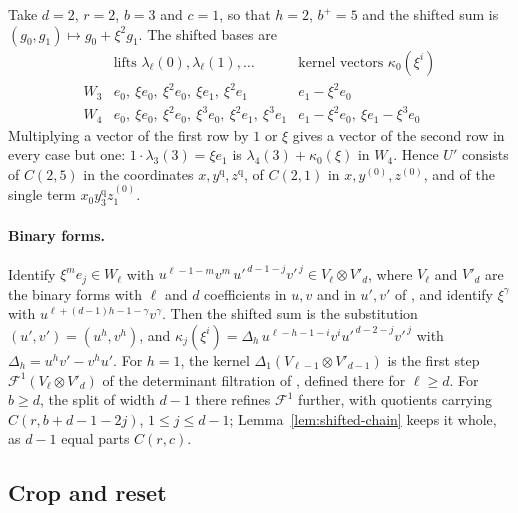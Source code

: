\begin{example}\label{ex:shifted-chain}
Take \(d=2\), \(r=2\), \(b=3\) and \(c=1\), so that \(h=2\), \(b^+=5\)
and the shifted sum is \((g_0,g_1)\mapsto g_0+\xi^2g_1\). The shifted
bases are
\[
\begin{array}{c|l|l}
 &\text{lifts }\lambda_\ell(0),\lambda_\ell(1),\ldots&\text{kernel vectors }\kappa_0(\xi^i)\\ \hline
 W_3&e_0,\ \xi e_0,\ \xi^2e_0,\ \xi e_1,\ \xi^2e_1&e_1-\xi^2e_0\\
 W_4&e_0,\ \xi e_0,\ \xi^2e_0,\ \xi^3e_0,\ \xi^2e_1,\ \xi^3e_1&e_1-\xi^2e_0,\ \xi e_1-\xi^3e_0
\end{array}
\]
Multiplying a vector of the first row by \(1\) or \(\xi\) gives a vector
of the second row in every case but one: \(1\cdot\lambda_3(3)=\xi e_1\)
is \(\lambda_4(3)+\kappa_0(\xi)\) in \(W_4\). Hence \(U'\) consists of
\(C(2,5)\) in the coordinates \(x,y^{\mathrm q},z^{\mathrm q}\), of
\(C(2,1)\) in \(x,y^{(0)},z^{(0)}\), and of the single term
\(x_0y^{\mathrm q}_3z^{(0)}_1\).
\end{example}

\paragraph{Binary forms.}
Identify \(\xi^me_j\in W_\ell\) with
\(u^{\ell-1-m}v^m\,u'^{\,d-1-j}v'^{\,j}\in V_\ell\otimes V'_d\), where
\(V_\ell\) and \(V'_d\) are the binary forms with \(\ell\) and \(d\)
coefficients in \(u,v\) and in \(u',v'\) of \citep[Section~4.1]{FinCon26},
and identify \(\xi^\gamma\) with \(u^{\ell+(d-1)h-1-\gamma}v^\gamma\). Then
the shifted sum is the substitution \((u',v')=(u^h,v^h)\), and
\(\kappa_j(\xi^i)=\Delta_h\,u^{\ell-h-1-i}v^iu'^{\,d-2-j}v'^{\,j}\) with
\(\Delta_h=u^hv'-v^hu'\). For \(h=1\), the kernel
\(\Delta_1(V_{\ell-1}\otimes V'_{d-1})\) is the first step
\(\mathcal F^1(V_\ell\otimes V'_d)\) of the determinant filtration
of \citep[Section~4.1]{FinCon26}, defined there for \(\ell\ge d\). For
\(b\ge d\), the split of width \(d-1\) there refines \(\mathcal F^1\)
further, with quotients carrying \(C(r,b+d-1-2j)\), \(1\le j\le d-1\);
Lemma~\ref{lem:shifted-chain} keeps it whole, as \(d-1\) equal parts
\(C(r,c)\).

\subsection{Crop and reset}
\label{subsec:reset}


